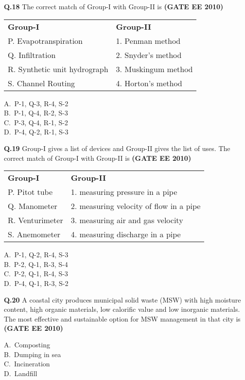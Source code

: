 \documentclass[journal,12pt,onecolumn]{exam}
\theoremstyle{remark}
\begin{document}
\noindent\textbf{Q.18} The correct match of Group-I with Group-II is
\hfill\textbf{(GATE EE 2010)}

\begin{center}
\begin{tabular}{l l}
\textbf{Group-I}  & \textbf{Group-II}  \\
P. Evapotranspiration     & 1. Penman method \\
Q. Infiltration    & 2. Snyder’s method \\
R. Synthetic unit hydrograph    & 3. Muskingum method  \\
S. Channel Routing    & 4. Horton's method
\end{tabular}
\end{center}

\begin{multicols}{4}
A.\ P-1, Q-3, R-4, S-2 \\
B.\ P-1, Q-4, R-2, S-3 \\
C.\ P-3, Q-4, R-1, S-2 \\
D.\ P-4, Q-2, R-1, S-3
\end{multicols}

\noindent\textbf{Q.19} Group-I gives a list of devices and Group-II gives the list of uses. The correct match of Group-I with Group-II is
\hfill\textbf{(GATE EE 2010)}

\begin{center}
\begin{tabular}{l l}
\textbf{Group-I}  & \textbf{Group-II}  \\
P. Pitot tube & 1. measuring pressure in a pipe \\
Q. Manometer   & 2. measuring velocity of flow in a pipe     \\
R. Venturimeter     & 3. measuring air and gas velocity          \\
S. Anemometer    & 4. measuring discharge in a pipe
\end{tabular}
\end{center}

\begin{multicols}{4}
A.\ P-1, Q-2, R-4, S-3 \\
B.\ P-2, Q-1, R-3, S-4 \\
C.\ P-2, Q-1, R-4, S-3 \\
D.\ P-4, Q-1, R-3, S-2
\end{multicols}

\noindent\textbf{Q.20} A coastal city produces municipal solid waste (MSW) with high moisture content, high organic materials, low calorific value and low inorganic materials. The most effective and sustainable option for MSW management in that city is
\hfill\textbf{(GATE EE 2010)}
\begin{multicols}{4}
A.\ Composting \\
B.\ Dumping in sea \\
C.\ Incineration \\
D.\ Landfill
\end{multicols}
\end{document}
